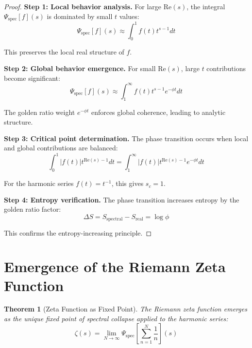 \documentclass[12pt]{article}
\theoremstyle{plain}
\newtheorem{theorem}{Theorem}[section]
\theoremstyle{definition}
\begin{document}
\begin{proof}
\textbf{Step 1: Local behavior analysis.}
For large $\text{Re}(s)$, the integral $\Psi_{\text{spec}}[f](s)$ is dominated by small $t$ values:
$$\Psi_{\text{spec}}[f](s) \approx \int_0^1 f(t) t^{s-1} dt$$

This preserves the local real structure of $f$.

\textbf{Step 2: Global behavior emergence.}
For small $\text{Re}(s)$, large $t$ contributions become significant:
$$\Psi_{\text{spec}}[f](s) \approx \int_1^{\infty} f(t) t^{s-1} e^{-\phi t} dt$$

The golden ratio weight $e^{-\phi t}$ enforces global coherence, leading to analytic structure.

\textbf{Step 3: Critical point determination.}
The phase transition occurs when local and global contributions are balanced:
$$\int_0^1 |f(t)| t^{\text{Re}(s)-1} dt = \int_1^{\infty} |f(t)| t^{\text{Re}(s)-1} e^{-\phi t} dt$$

For the harmonic series $f(t) = t^{-1}$, this gives $s_c = 1$.

\textbf{Step 4: Entropy verification.}
The phase transition increases entropy by the golden ratio factor:
$$\Delta S = S_{\text{spectral}} - S_{\text{real}} = \log \phi$$

This confirms the entropy-increasing principle.
\end{proof}

\section{Emergence of the Riemann Zeta Function}

\begin{theorem}[Zeta Function as Fixed Point]
\label{thm:zeta-emergence}
The Riemann zeta function emerges as the unique fixed point of spectral collapse applied to the harmonic series:
$$\zeta(s) = \lim_{N \to \infty} \Psi_{\text{spec}}\left[\sum_{n=1}^N \frac{1}{n}\right](s)$$
\end{theorem}
\end{document}
